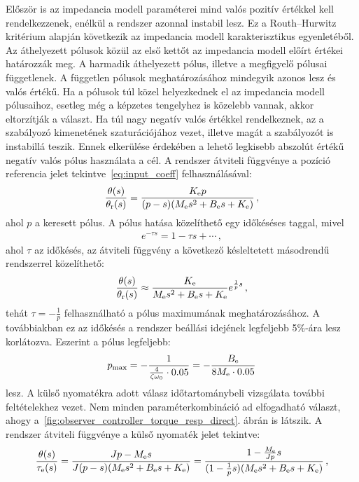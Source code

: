 Először is az impedancia modell paraméterei mind valós pozitív értékkel kell rendelkezzenek, enélkül a rendszer 
azonnal instabil lesz. Ez a Routh--Hurwitz kritérium alapján következik az impedancia modell karakterisztikus egyenletéből.
Az áthelyezett pólusok közül az első kettőt az impedancia modell előírt értékei határozzák meg. 
A harmadik áthelyezett pólus, illetve a megfigyelő pólusai függetlenek. A független pólusok meghatározásához 
mindegyik azonos lesz és valós értékű. Ha a pólusok túl közel helyezkednek el az impedancia modell pólusaihoz,
esetleg még a képzetes tengelyhez is közelebb vannak, akkor eltorzítják a választ. Ha túl nagy negatív valós
értékkel rendelkeznek, az a szabályozó kimenetének szaturációjához vezet, illetve magát a szabályozót is
instabillá teszik. Ennek elkerülése érdekében a lehető legkisebb abszolút értékű negatív valós pólus használata a cél. 
A rendszer átviteli függvénye a pozíció referencia jelet tekintve~\eqref{eq:input_coeff} felhasználásával:
\begin{align}
    \frac{\theta(s)}{\theta_{\mathrm{r}} (s)} = \frac{K_{\mathrm{e}} p}{(p-s)(M_{\mathrm{e}} s^2 + B_{\mathrm{e}} s + K_{\mathrm{e}})}\,,
\end{align}
ahol \(p\) a keresett pólus. A pólus hatása közelíthető egy időkéséses taggal, mivel
\begin{align}
    e^{-\tau s} = 1 - \tau s + \cdots\,,
\end{align}
ahol \(\tau\) az időkésés, az átviteli függvény a következő késleltetett másodrendű rendszerrel közelíthető:
\begin{align}
    \frac{\theta(s)}{\theta_{\mathrm{r}} (s)} \approx \frac{K_{\mathrm{e}}}{M_{\mathrm{e}} s^2 + B_{\mathrm{e}} s + K_{\mathrm{e}}}e^{\frac{1}{p}s}\,,
\end{align}
tehát \(\tau = -\frac{1}{p}\) felhasználható a pólus maximumának meghatározásához. A továbbiakban 
ez az időkésés a rendszer beállási idejének legfeljebb 5\%-ára lesz korlátozva. Eszerint a pólus legfeljebb:
\begin{align}\label{eq:pole_selection_pos}
    p_{\mathrm{max}} = -\frac{1}{\frac{4}{\zeta \omega_0} \cdot 0.05} = -\frac{B_{\mathrm{e}}}{8M_{\mathrm{e}} \cdot 0.05}
\end{align}
lesz. A külső nyomatékra adott válasz időtartománybeli vizsgálata további feltételekhez vezet. 
Nem minden paraméterkombináció ad elfogadható választ, ahogy a~\ref{fig:observer_controller_torque_resp_direct}.
ábrán is látszik. A rendszer átviteli függvénye a külső nyomaték jelet tekintve:
\begin{align}
    \frac{\theta(s)}{\tau_{\mathrm{e}} (s)} = 
    \frac{Jp - M_{\mathrm{e}} s}{J(p-s)(M_{\mathrm{e}} s^2 + B_{\mathrm{e}} s + K_{\mathrm{e}})} = 
    \frac{1 -\frac{M_{\mathrm{e}}}{Jp} s}{(1-\frac{1}{p}s)(M_{\mathrm{e}} s^2 + B_{\mathrm{e}} s + K_{\mathrm{e}})}\,,
\end{align}
